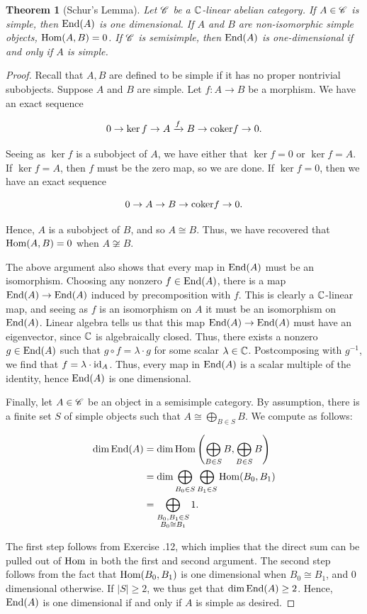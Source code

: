 \documentclass{article}
\newtheorem{theorem}{Theorem}[section]
\theoremstyle{definition}
\numberwithin{figure}{section}
\begin{document}
\begin{theorem}[Schur's Lemma]\label{Schurs Lemma} Let $\mathscr{C}$ be a $\mathbb{C}$-linear abelian category. If $A\in \mathscr{C}$ is simple, then $\mathrm{End}(A)$ is one dimensional. If $A$ and $B$ are non-isomorphic simple objects, $\mathrm{Hom}(A,B)=0$. If $\mathscr{C}$ is semisimple, then $\mathrm{End}(A)$ is one-dimensional if and only if $A$ is simple.
\end{theorem}
\begin{proof} Recall that $A,B$ are defined to be simple if it has no proper nontrivial subobjects. Suppose $A$ and $B$ are simple. Let $f:A\to B$ be a morphism. We have an exact sequence

$$0\to \ker f \to A\xrightarrow{f} B\to \mathrm{coker} f\to 0.$$

 Seeing as $\ker f$ is a subobject of $A$, we have either that $\ker f= 0$ or $\ker f = A$. If $\ker f = A$, then $f$ must be the zero map, so we are done. If $\ker f =0$, then we have an exact sequence

$$0\to A\to B\to \mathrm{coker} f\to 0.$$

Hence, $A$ is a subobject of $B$, and so $A\cong B$. Thus, we have recovered that $\mathrm{Hom}(A,B)=0$ when $A\not\cong B$.

The above argument also shows that every map in $\mathrm{End}(A)$ must be an isomorphism. Choosing any nonzero $f\in \mathrm{End}(A)$, there is a map $\mathrm{End}(A)\to \mathrm{End}(A)$ induced by precomposition with $f$. This is clearly a $\mathbb{C}$-linear map, and seeing as $f$ is an isomorphism on $A$ it must be an isomorphism on $\mathrm{End}(A)$. Linear algebra tells us that this map $\mathrm{End}(A)\to \mathrm{End}(A)$ must have an eigenvector, since $\mathbb{C}$ is algebraically closed. Thus, there exists a nonzero $g\in \mathrm{End}(A)$ such that $g\circ f=\lambda \cdot g$ for some scalar $\lambda\in \mathbb{C}$. Postcomposing with $g^{-1}$, we find that $f=\lambda \cdot\mathrm{id}_A$. Thus, every map in $\mathrm{End}(A)$ is a scalar multiple of the identity, hence $\mathrm{End}(A)$ is one dimensional.

Finally, let $A\in \mathscr{C}$ be an object in a semisimple category. By assumption, there is a finite set $S$ of simple objects such that $A\cong \bigoplus_{B\in S}B$. We compute as follows:

\begin{align*}
\dim \mathrm{End}(A)&=\dim \mathrm{Hom}\left(\bigoplus_{B\in S}B,\bigoplus_{B\in S} B\right)\\
&=\dim \bigoplus_{B_0 \in S}\bigoplus_{B_1\in S}\mathrm{Hom}(B_0,B_1)\\
&=\bigoplus_{\substack{B_0,B_1\in S \\ B_0\cong B_1}}1.
\end{align*}

The first step follows from Exercise \thesection.12, which implies that the direct sum can be pulled out of $\mathrm{Hom}$ in both the first and second argument. The second step follows from the fact that $\mathrm{Hom}(B_0,B_1)$ is one dimensional when $B_0\cong B_1$, and $0$ dimensional otherwise. If $|S|\geq 2$, we thus get that $\dim \mathrm{End}(A)\geq 2$. Hence, $\mathrm{End}(A)$ is one dimensional if and only if $A$ is simple as desired.
\end{proof}
\end{document}
